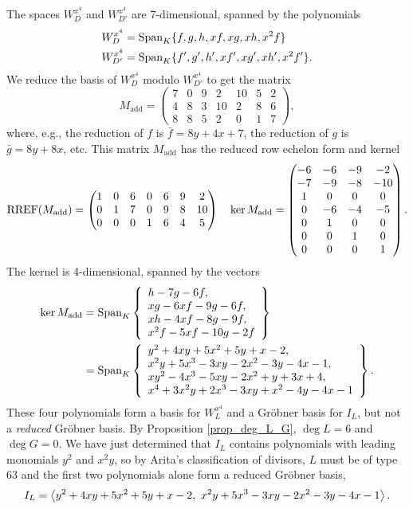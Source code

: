 The spaces $W_D^{x^4}$ and $W_{D'}^{x^4}$ are 7-dimensional, spanned by the polynomials
\begin{align*}
  W_D^{x^4} &= \operatorname{Span}_K\{ f, g, h, xf, xg, xh, x^2f \} \\
  W_{D'}^{x^4} &= \operatorname{Span}_K\{ f', g', h', xf', xg', xh', x^2f' \}.
\end{align*}
We reduce the basis of $W_D^{x^4}$ modulo $W_{D'}^{x^4}$ to get the matrix
\[ M_{\text{add}} = \begin{pmatrix}
  7 & 0 & 9 & 2 & 10 & 5 & 2 \\
  4 & 8 & 3 & 10 & 2 & 8 & 6 \\
  8 & 8 & 5 & 2 & 0 & 1 & 7
\end{pmatrix}, \]
where, e.g., the reduction of $f$ is $\bar f = 8y + 4x + 7$,
the reduction of $g$ is $\bar g = 8y + 8x$, etc.
This matrix $M_{\text{add}}$ has the reduced row echelon form
and kernel
\[ \operatorname{RREF}(M_{\text{add}}) = \begin{pmatrix}
  1 & 0 & 6 & 0 & 6 & 9 & 2 \\
  0 & 1 & 7 & 0 & 9 & 8 & 10 \\
  0 & 0 & 0 & 1 & 6 & 4 & 5
\end{pmatrix} ~~~ \ker M_{\text{add}} =
\begin{pmatrix}
  -6 & -6 & -9 & -2 \\
  -7 & -9 & -8 & -10 \\
   1 &  0 &  0 &  0 \\
   0 & -6 & -4 & -5 \\
   0 &  1 &  0 &  0 \\
   0 &  0 &  1 &  0 \\
   0 &  0 &  0 &  1
\end{pmatrix}. \]
The kernel is 4-dimensional, spanned by the vectors
\begin{align*}
  \ker M_{\text{add}}
    &= \operatorname{Span}_K \left\{ \begin{array}{l}
               h -  7g - 6f, \\
        xg - 6xf -  9g - 6f, \\
        xh - 4xf -  8g - 9f, \\
      x^2f - 5xf - 10g - 2f \end{array} \right\} \\
    &= \operatorname{Span}_K \left\{ \begin{array}{l}
      y^2 + 4xy + 5x^2 + 5y + x - 2, \\
      x^2y + 5x^3 - 3xy - 2x^2 - 3y - 4x - 1, \\
      xy^2 - 4x^3 - 5xy - 2x^2 + y + 3x + 4, \\
      x^4 + 3x^2y + 2x^3 - 3xy + x^2 - 4y - 4x - 1
    \end{array} \right\}.
\end{align*}
These four polynomials form a basis for $W_L^{x^4}$ and a Gr\"obner basis for $I_L$,
but not a \emph{reduced} Gr\"obner basis.
By Proposition \ref{prop_deg_L_G}, $\deg L = 6$ and $\deg G = 0$.
We have just determined that $I_L$ contains polynomials with leading monomials $y^2$ and $x^2y$,
so by Arita's classification of divisors, $L$ must be of type 63 and the first two polynomials
alone form a reduced Gr\"obner basis,
  \[ I_L = \left\langle  y^2 + 4xy + 5x^2 + 5y + x - 2, ~x^2y + 5x^3 - 3xy - 2x^2 - 3y - 4x - 1 \right\rangle.\]

